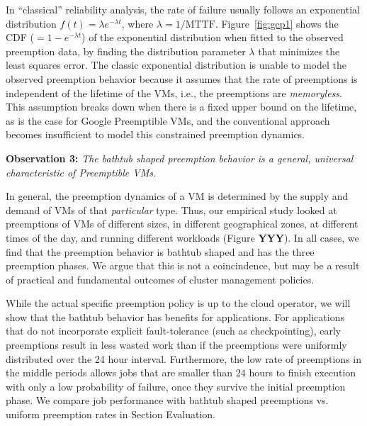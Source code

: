 \noindent In ``classical'' reliability analysis, the rate of failure  usually follows an exponential distribution $f(t) = \lambda e^{-\lambda t}$, where $\lambda=1/\text{MTTF}$.
Figure~\ref{fig:gcp1} shows the CDF ($=1-e^{-\lambda t}$) of the exponential distribution when fitted to the observed preemption data, by finding the distribution parameter $\lambda$ that minimizes the least squares error.
The classic exponential distribution is unable to model the observed preemption behavior because it assumes that the rate of preemptions is independent of the lifetime of the VMs, i.e., the preemptions are \emph{memoryless}.
This assumption breaks down when there is a fixed upper bound on the lifetime, as is the case for Google Preemptible VMs, and the conventional approach becomes insufficient to model this constrained preemption dynamics. 

\noindent \textbf{Observation 3:} \emph{The bathtub shaped preemption behavior is a general, universal characteristic of Preemptible VMs.}

In general, the preemption dynamics of a VM is determined by the supply and demand of VMs of that \emph{particular} type.
Thus, our empirical study looked at preemptions of VMs of different sizes, in different geographical zones, at different times of the day, and running different workloads (Figure \textbf{YYY}).
In all cases, we find that the preemption behavior is bathtub shaped and has the three preemption phases. 
We argue that this is not a coincindence, but may be a result of practical and fundamental outcomes of cluster management policies. 

While the actual specific preemption policy is up to the cloud operator, we will show that the bathtub behavior has benefits for applications. 
For applications that do not incorporate explicit fault-tolerance (such as checkpointing), early preemptions result in less wasted work than if the preemptions were uniformly distributed over the 24 hour interval.
Furthermore, the low rate of preemptions in the middle periods allows jobs that are smaller than 24 hours to finish execution with only a low probability of failure, once they survive the initial preemption phase. 
We compare job performance with bathtub shaped preemptions vs. uniform preemption rates in Section Evaluation.

